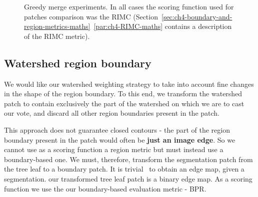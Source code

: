 \begin{figure}[ht!]
\centering
\caption[Greedy merge experiments]{Greedy merge experiments. In all cases the scoring function used for patches comparison was the RIMC (Section~\ref*{sec:ch4-boundary-and-region-metrics-maths}~\ref{par:ch4-RIMC-maths} contains a description of the RIMC metric).} %
\label{fig:segs-to-greedy-merge-RIMC}
\end{figure}

\subsection*{Watershed region boundary}
We would like our watershed weighting strategy to take into account fine changes in the shape of the region boundary. To this end, we transform the watershed patch to contain exclusively the part of the watershed on which we are to cast our vote, and discard all other region boundaries present in the patch.

This approach does not guarantee closed contours - the part of the region boundary present in the patch would often be \textbf{just an image edge}. So we cannot use as a scoring function a region metric but must instead use a boundary-based one. We must, therefore, transform the segmentation patch from the tree leaf to a boundary patch. It is trivial~\cite{Arbelaez11} to obtain an edge map, given a segmentation. our transformed tree leaf patch is a binary edge map. As a scoring function we use the our boundary-based evaluation metric - BPR.


